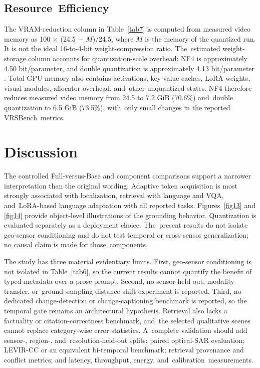 \documentclass[applsci,article,accept,moreauthors]{Definitions/mdpi}
\begin{document}
\subsection{Resource~Efficiency}\label{sec5.4}



The VRAM-reduction column in Table~\ref{tab7} is computed from measured video memory as 100 $\times$ (24.5 $-$ $M$)/24.5, where $M$ is the memory of the quantized run. It is not the ideal 16-to-4-bit weight-compression ratio. The~estimated weight-storage column accounts for quantization-scale overhead: NF4 is approximately 4.50 bit/parameter, and double quantization is approximately 4.13 bit/parameter \citep{ref30}. Total GPU memory also contains activations, key-value caches, LoRA weights, visual modules, allocator overhead, and~other unquantized states. NF4 therefore reduces measured video memory from 24.5 to 7.2 GiB (70.6\%) and~double quantization to 6.5 GiB (73.5\%), with~only small changes in the reported VRSBench~metrics.



\section{Discussion}

The controlled Full-versus-Base and component comparisons support a narrower interpretation than the original wording. Adaptive token acquisition is most strongly associated with localization, retrieval with language and VQA, and~LoRA-based language adaptation with all reported tasks. Figures~\ref{fig13} and \ref{fig14} provide object-level illustrations of the grounding behavior. Quantization is evaluated separately as a deployment choice. The~present results do not isolate geo-sensor conditioning and do not test temporal or cross-sensor generalization; no causal claim is made for those~components.

The study has three material evidentiary limits. First, geo-sensor conditioning is not isolated in Table~\ref{tab6}, so the current results cannot quantify the benefit of typed metadata over a prose prompt. Second, no sensor-held-out, modality-transfer, or~ground-sampling-distance shift experiment is reported. Third, no dedicated change-detection or change-captioning benchmark is reported, so the temporal gate remains an architectural hypothesis. Retrieval also lacks a factuality or citation-correctness benchmark, and~the selected qualitative scenes cannot replace category-wise error statistics. A~complete validation should add sensor-, region-, and~resolution-held-out splits; paired optical-SAR evaluation; LEVIR-CC or an equivalent bi-temporal benchmark; retrieval provenance and conflict metrics; and latency, throughput, energy, and~calibration~measurements.
\end{document}
